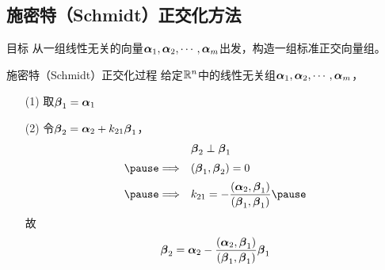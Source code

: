 \subsection{施密特（Schmidt）正交化方法}
\begin{frame}
  \begin{footnotesize}
    \begin{block}{目标}
      从一组线性无关的向量$\boldsymbol{\alpha}_1,\boldsymbol{\alpha}_2,\cdots,\boldsymbol{\alpha}_m$出发，构造一组标准正交向量组。
    \end{block}
  \end{footnotesize}
\end{frame}


\begin{frame}
  \begin{footnotesize}
    \begin{block}{施密特（Schmidt）正交化过程}
      给定$\mathbb{R}^n$中的线性无关组$\boldsymbol{\alpha}_1,\boldsymbol{\alpha}_2,\cdots,\boldsymbol{\alpha}_m$， \pause
      \begin{itemize}
      \item[(1)] 取$\boldsymbol{\beta}_1=\boldsymbol{\alpha}_1$\pause
      \item[(2)] 令$\boldsymbol{\beta}_2=\boldsymbol{\alpha}_2+k_{21}\boldsymbol{\beta}_1$，\pause
        $$
        \begin{array}{rl}
          &\betabd_2\perp\betabd_1\\[0.2cm]\pause
          \Longrightarrow&(\betabd_1,\betabd_2)=0\\[0.2cm] \pause
          \Longrightarrow& \ds k_{21}=-\frac{(\alphabd_2,\betabd_1)}{(\betabd_1,\betabd_1)} \pause
        \end{array}
        $$
        故
        $$
        \boldsymbol{\beta}_2=\boldsymbol{\alpha}_2-\frac{(\boldsymbol{\alpha}_2,\boldsymbol{\beta}_1)}{(\boldsymbol{\beta}_1,\boldsymbol{\beta}_1)}\boldsymbol{\beta}_1
        $$
      \end{itemize}
    \end{block}

  \end{footnotesize}
\end{frame}


